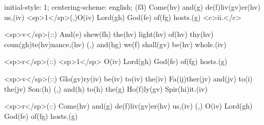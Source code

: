 initial-style: 1;
centering-scheme: english;
(f3) Come(hv) and(g) de(f)liv(gv)er(hv) us,(iv) <sp>1</sp>(,)O(iv) Lord(gh) God(fe) of(fg) hosts.(g) <c>ii.</c>

<sp>v</sp>(::) And(e) shew(fh) the(hv) light(hv) of(hv) thy(hv) coun(gh)te(hv)nance,(hv) (,) and(hg) we(f) shall(gv) be(hv) whole.(iv) 

<sp>r</sp>(::) <sp>1</sp> O(iv) Lord(gh) God(fe) of(fg) hosts.(g)

<sp>v</sp>(::) Glo(gv)ry(iv) be(iv) to(iv) the(iv) Fa(ij)ther(jv) and(jv) to(i) the(jv) Son:(h) (,) and(h) to(h) the(g) Ho(f)ly(gv) Spir(hi)it.(iv)

<sp>r</sp>(::) Come(hv) and(g) de(f)liv(gv)er(hv) us,(iv) (,) O(iv) Lord(gh) God(fe) of(fg) hosts.(g) 